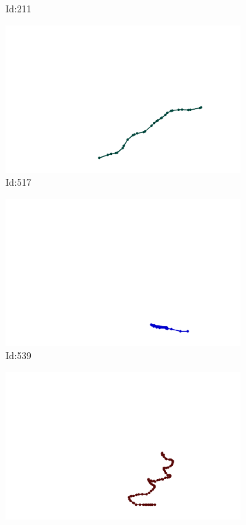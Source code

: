 \documentclass[12pt,twoside]{report}
\begin{document}
\begin{figure}
\begin{subfigure}[b]{0.20\textwidth}
\caption{Id:211}
\end{subfigure}
\begin{subfigure}[b]{0.20\textwidth}
\centering
\includegraphics[width=\textwidth]{../../trajectories/517.png}
\caption{Id:517}
\end{subfigure}
\begin{subfigure}[b]{0.20\textwidth}
\centering
\includegraphics[width=\textwidth]{../../trajectories/539.png}
\caption{Id:539}
\end{subfigure}
\begin{subfigure}[b]{0.20\textwidth}
\centering
\includegraphics[width=\textwidth]{../../trajectories/666.png}

\end{subfigure}
\end{figure}
\end{document}
